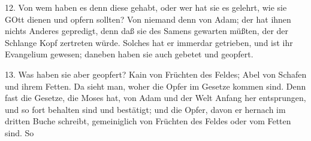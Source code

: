 12. Von wem haben es denn diese gehabt, oder wer hat sie es gelehrt, wie sie GOtt dienen und opfern sollten? Von niemand denn von Adam; der hat ihnen nichts Anderes gepredigt, denn daß sie des Samens gewarten müßten, der der Schlange Kopf zertreten würde. Solches hat er immerdar getrieben, und ist ihr Evangelium gewesen; daneben haben sie auch gebetet und geopfert.

13. Was haben sie aber geopfert? Kain von Früchten des Feldes; Abel von Schafen und ihrem Fetten. Da sieht man, woher die Opfer im Gesetze kommen sind. Denn fast die Gesetze, die Moses hat, von Adam und der Welt Anfang her entsprungen, und so fort behalten sind und bestätigt; und die Opfer, davon er hernach im dritten Buche schreibt, gemeiniglich von Früchten des Feldes oder vom Fetten sind. So
